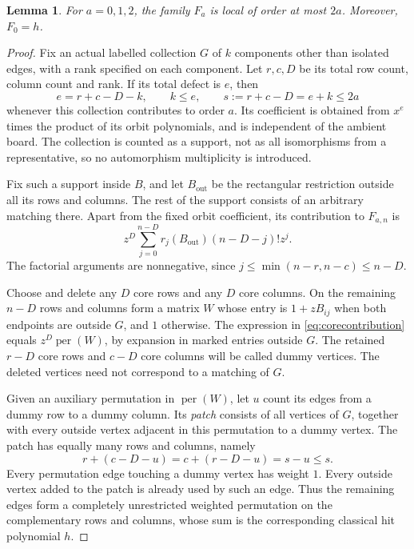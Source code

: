 \documentclass[11pt]{article}
\newtheorem{lemma}[theorem]{Lemma}
\DeclareMathOperator{\per}{per}
\begin{document}
\begin{lemma}\label{lem:rooklocality}
For $a=0,1,2$, the family $F_a$ is local of order at most $2a$.
Moreover, $F_0=h$.
\end{lemma}
\begin{proof}
Fix an actual labelled collection $G$ of $k$ components other than
isolated edges, with a rank specified on each component. Let $r,c,D$
be its total row count, column count and rank. If its total defect is
$e$, then
\begin{equation}\label{eq:sizebound}
 e=r+c-D-k,\qquad k\leq e,\qquad
 s:=r+c-D=e+k\leq2a
\end{equation}
whenever this collection contributes to order $a$. Its coefficient is
obtained from $x^e$ times the product of its orbit polynomials, and is
independent of the ambient board. The collection is counted as a support,
not as all isomorphisms from a representative, so no automorphism
multiplicity is introduced.

Fix such a support inside $B$, and let $B_{\mathrm{out}}$ be the
rectangular restriction outside all its rows and columns. The rest of
the support consists of an arbitrary matching there. Apart from the
fixed orbit coefficient, its contribution to $F_{a,n}$ is
\begin{equation}\label{eq:corecontribution}
 z^D\sum_{j=0}^{n-D}r_j(B_{\mathrm{out}})(n-D-j)!z^j.
\end{equation}
The factorial arguments are nonnegative, since
$j\leq\min(n-r,n-c)\leq n-D$.

Choose and delete any $D$ core rows and any $D$ core columns. On the
remaining $n-D$ rows and columns form a matrix $W$ whose entry is
$1+zB_{ij}$ when both endpoints are outside $G$, and $1$ otherwise.
The expression in \eqref{eq:corecontribution} equals $z^D\per(W)$,
by expansion in marked entries outside $G$. The retained $r-D$ core
rows and $c-D$ core columns will be called dummy vertices. The deleted
vertices need not correspond to a matching of $G$.

Given an auxiliary permutation in $\per(W)$, let $u$ count its edges
from a dummy row to a dummy column. Its \emph{patch} consists of all
vertices of $G$, together with every outside vertex adjacent in this
permutation to a dummy vertex. The patch has equally many rows and
columns, namely
\begin{equation}\label{eq:patchsize}
 r+(c-D-u)=c+(r-D-u)=s-u\leq s.
\end{equation}
Every permutation edge touching a dummy vertex has weight $1$.
Every outside vertex added to the patch is already used by such an
edge. Thus the remaining edges form a completely unrestricted weighted
permutation on the complementary rows and columns, whose sum is the
corresponding classical hit polynomial $h$.


\end{proof}
\end{document}
